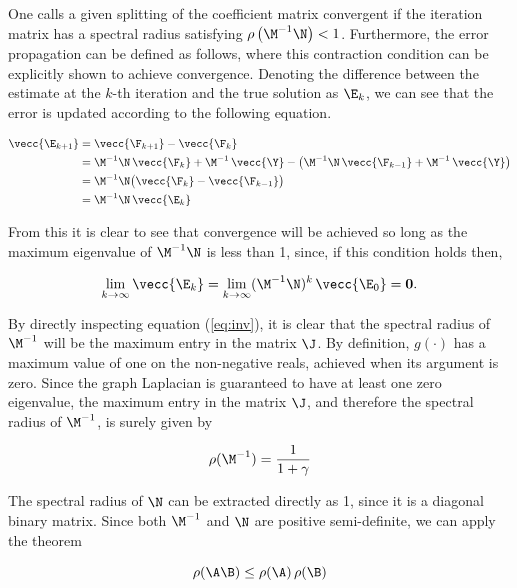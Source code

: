 One calls a given splitting of the coefficient matrix convergent if the iteration matrix has a spectral radius satisfying $\rho\left(\M^{-1}\N\right) < 1$. Furthermore, the error propagation can be defined as follows, where this contraction condition can be explicitly shown to achieve convergence. Denoting the difference between the estimate at the $k$-th iteration and the true solution as $\E_k$, we can see that the error is updated according to the following equation. 

\begin{align}
\label{eq:E}
\vecc{\E_{k+1}} &= \vecc{\F_{k+1}} - \vecc{\F_{k}} \notag \\
&= \M^{-1} \N \,  \vecc{\F_k} + \M^{-1} \, \vecc{\Y} - \big(\M^{-1} \N \,  \vecc{\F_{k-1}} + \M^{-1} \, \vecc{\Y} \big)\notag \\
&= \M^{-1} \N \big(\vecc{\F_k} - \vecc{\F_{k-1}} \big) \notag \\
&= \M^{-1} \N \,  \vecc{\E_k} 
\end{align}

From this it is clear to see that convergence will be achieved so long as the maximum eigenvalue of $\M^{-1} \N$ is less than 1, since, if this condition holds then, 

\begin{equation}
\lim_{k \rightarrow \infty} \vecc{\E_k} = \lim_{k \rightarrow \infty} (\M^{-1} \N)^{k} \, \vecc{\E_0} = \mathbf{0} .
\end{equation}

By directly inspecting equation (\ref{eq:inv}), it is clear that the spectral radius of $\M^{-1}$ will be the maximum entry in the matrix $\J$. By definition, $g(\cdot)$ has a maximum value of one on the non-negative reals, achieved when its argument is zero. Since the graph Laplacian is guaranteed to have at least one zero eigenvalue, the maximum entry in the matrix $\J$, and therefore the spectral radius of $\M^{-1}$, is surely given by

\begin{equation}
\rho(\M^{-1}) = \frac{1}{1 + \gamma}
\end{equation}

The spectral radius of $\N$ can be extracted directly as 1, since it is a diagonal binary matrix. Since both $\M^{-1}$ and $\N$ are positive semi-definite, we can apply the theorem 

\begin{equation}
\label{eq:psd}
\rho(\A\B) \leq \rho(\A) \, \rho(\B)
\end{equation}

